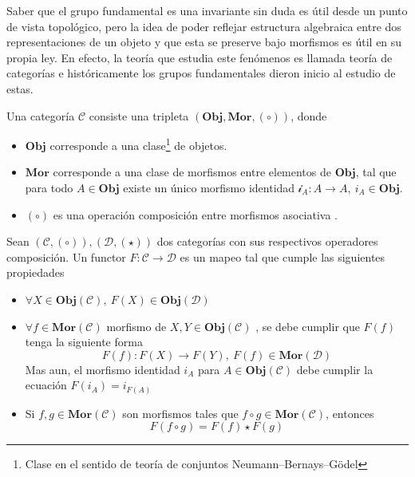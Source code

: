 {Saber que el grupo fundamental es una invariante sin duda es útil
desde un punto de vista topológico, pero la idea de poder reflejar
estructura algebraica entre dos representaciones de un objeto y que esta
se preserve bajo morfismos es útil en su propia ley. En efecto, la
teoría que estudia este fenómenos es llamada teoría de categorías e
históricamente los grupos fundamentales dieron inicio al estudio de
estas.
\begin{definicion}
  Una categoría \(\mathcal C\) consiste una tripleta \(( \mathbf {Obj},
  \mathbf {Mor}, (\circ))\), donde
  \begin{itemize}
    \item \(\mathbf {Obj}\) corresponde a una clase\footnote{Clase en el
      sentido de teoría de conjuntos Neumann–Bernays–Gödel} de objetos.
    \item \(\mathbf {Mor}\) corresponde a una clase de morfismos entre
      elementos de \(\mathbf {Obj}\), tal que para todo \(A \in
      \mathbf {Obj}\) existe un único morfismo identidad \( \mathcal i
      _A : A \to A, \ i_A \in \mathbf{Obj}\).
    \item \((\circ)\) es una operación composición entre morfismos
      asociativa .
  \end{itemize}
\end{definicion}
\begin{definicion}
  Sean \(\left( \mathscr{C} , (\circ) \right), \left(\mathscr D ,
  (\star) \right) \) dos categorías con sus respectivos operadores
  composición. Un functor \(F : \mathscr C \to \mathscr D\) es un mapeo
  tal que cumple las siguientes propiedades
  \begin{itemize}
  \item \(\forall X \in \mathbf{Obj}(\mathscr C),\ F(X) \in \mathbf{Obj} (\mathscr D)\)
  \item \(\forall f \in \mathbf{Mor} (\mathcal C)\) morfismo de \(X,Y
    \in \mathbf{Obj} (\mathcal C)\) , se
    debe cumplir que \(F (f)\) tenga la siguiente forma
    \[ F(f) : F(X) \to F(Y),\ F(f) \in \mathbf{Mor}
      (\mathcal D) \]
    Mas aun, el morfismo identidad \(i_A\) para \(A \in
    \mathbf{Obj} (\mathcal C)\) debe cumplir la ecuación \(F (i_A) =
    i_{F(A)}\)
  \item Si \(f,g \in \mathbf{Mor}(\mathcal C)\) son morfismos tales que
    \(f \circ g \in \mathbf{Mor} (\mathcal C)\), entonces
    \[ F(f \circ g) = F(f) \star F(g) \]
  \end{itemize}
\end{definicion}
}
